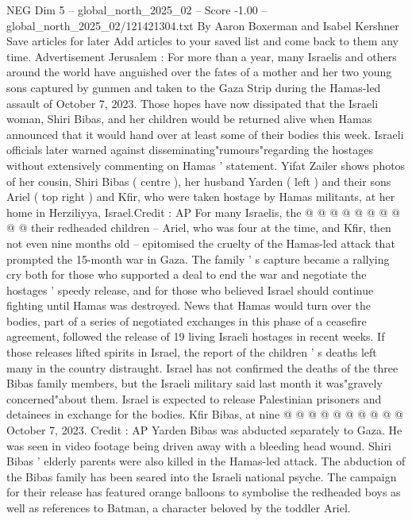 \begin{textsample}{NEG Dim 5 – global\_north\_2025\_02 – Score -1.00 – global\_north\_2025\_02/121421304.txt}  \label{ex:f5_neg_242}
By Aaron Boxerman and Isabel Kershner Save articles for later Add articles to your saved list and come back to them any time.
Advertisement Jerusalem : For more than a year, many Israelis and others around the world have anguished over the fates of a mother and her two young sons captured by gunmen and taken to the Gaza Strip during the Hamas-led assault of October 7, 2023.
Those hopes have now dissipated that the Israeli woman, Shiri Bibas, and her children would be returned alive when Hamas announced that it would hand over at least some of their bodies this week.
Israeli officials later warned against disseminating"rumours"regarding the hostages without extensively commenting on Hamas ' statement.
Yifat Zailer shows photos of her cousin, Shiri Bibas ( centre ), her husband Yarden ( left ) and their sons Ariel ( top right ) and Kfir, who were taken hostage by Hamas militants, at her home in Herziliyya, Israel.Credit : AP For many Israelis, the @ @ @ @ @ @ @ @ @ @ their redheaded children -- Ariel, who was four at the time, and Kfir, then not even nine months old -- epitomised the cruelty of the Hamas-led attack that prompted the 15-month war in Gaza.
The family ' s capture became a rallying cry both for those who supported a deal to end the war and negotiate the hostages ' speedy release, and for those who believed Israel should continue fighting until Hamas was destroyed.
News that Hamas would turn over the bodies, part of a series of negotiated exchanges in this phase of a ceasefire agreement, followed the release of 19 living Israeli hostages in recent weeks.
If those releases lifted spirits in Israel, the report of the children ' s deaths left many in the country distraught.
Israel has not confirmed the deaths of the three Bibas family members, but the Israeli military said last month it was"gravely concerned"about them.
Israel is expected to release Palestinian prisoners and detainees in exchange for the bodies.
Kfir Bibas, at nine @ @ @ @ @ @ @ @ @ @ October 7, 2023.
Credit : AP Yarden Bibas was abducted separately to Gaza.
He was seen in video footage being driven away with a bleeding head wound.
Shiri Bibas ' elderly parents were also killed in the Hamas-led attack.
The abduction of the Bibas family has been seared into the Israeli national psyche.
The campaign for their release has featured orange balloons to symbolise the redheaded boys as well as references to Batman, a character beloved by the toddler Ariel.

\end{textsample}
